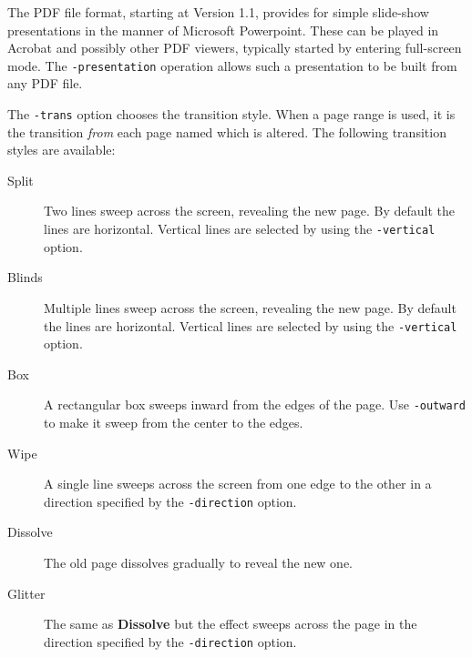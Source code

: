 \documentclass{book}
\begin{document}
\noindent{}


  \vspace{12mm}
The PDF file format, starting at Version 1.1, provides for simple slide-show
presentations in the manner of Microsoft Powerpoint. These can be played in
Acrobat and possibly other PDF viewers, typically started by entering
full-screen mode. The \texttt{-presentation} operation allows such a
presentation to be built from any PDF file.

The \texttt{-trans} option chooses the transition style. When a page range is
used, it is the transition \textit{from} each page named which is altered. The
following transition styles are available:

\begin{description}
  \item[Split]Two lines sweep across the screen, revealing the new page. By
default the lines are horizontal. Vertical lines are selected by using the
\texttt{-vertical} option.
  \item[Blinds]Multiple lines sweep across the screen, revealing the new page.
By default the lines are horizontal. Vertical lines are selected by using the
\texttt{-vertical} option.
  \item[Box]A rectangular box sweeps inward from the edges of the page. Use
\texttt{-outward} to make it sweep from the center to the edges.
  \item[Wipe]A single line sweeps across the screen from one edge to the other
in a direction specified by the \texttt{-direction} option.
  \item[Dissolve]The old page dissolves gradually to reveal the new one.
  \item[Glitter]The same as \textbf{Dissolve} but the effect sweeps across the
page in the direction specified by the \texttt{-direction} option.
\end{description}
\end{document}
